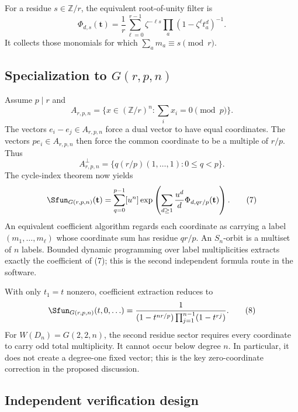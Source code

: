 \documentclass[10pt]{article}
\begin{document}
For a residue $s\in\mathbb Z/r$, the equivalent root-of-unity filter is
\[
\Phi_{d,s}(\mathbf t)=\frac1r\sum_{\ell=0}^{r-1}
\zeta^{-\ell s}\prod_a(1-\zeta^\ell t_a^d)^{-1}.
\]
It collects those monomials for which $\sum_am_a\equiv s\pmod r$.

\subsection{Specialization to $G(r,p,n)$}

Assume $p\mid r$ and
\[
A_{r,p,n}=\{x\in(\mathbb Z/r)^n:\sum_i x_i=0\pmod p\}.
\]
The vectors $e_i-e_j\in A_{r,p,n}$ force a dual vector to have equal
coordinates.  The vectors $p e_i\in A_{r,p,n}$ then force the common coordinate
to be a multiple of $r/p$.  Thus
\begin{equation}
A_{r,p,n}^\perp
=\{q(r/p)(1,\ldots,1):0\leq q<p\}.                            \tag{6}
\end{equation}
The cycle-index theorem now yields
\begin{equation}
\Sfun_{G(r,p,n)}(\mathbf t)
=\sum_{q=0}^{p-1}[u^n]\exp\left(
\sum_{d\geq1}\frac{u^d}{d}\Phi_{d,qr/p}(\mathbf t)\right).  \tag{7}
\end{equation}
An equivalent coefficient algorithm regards each coordinate as carrying a
label $(m_1,\ldots,m_\ell)$ whose coordinate sum has residue $qr/p$.  An
$S_n$-orbit is a multiset of $n$ labels.  Bounded dynamic programming over
label multiplicities extracts exactly the coefficient of (7); this is the
second independent formula route in the software.

With only $t_1=t$ nonzero, coefficient extraction reduces to
\begin{equation}
\Sfun_{G(r,p,n)}(t,0,\ldots)=
\frac1{(1-t^{nr/p})\prod_{j=1}^{n-1}(1-t^{rj})}.              \tag{8}
\end{equation}
For $W(D_n)=G(2,2,n)$, the second residue sector requires every coordinate to
carry odd total multiplicity.  It cannot occur below degree $n$.  In
particular, it does not create a degree-one fixed vector; this is the key
zero-coordinate correction in the proposed discussion.

\subsection{Independent verification design}
\end{document}
